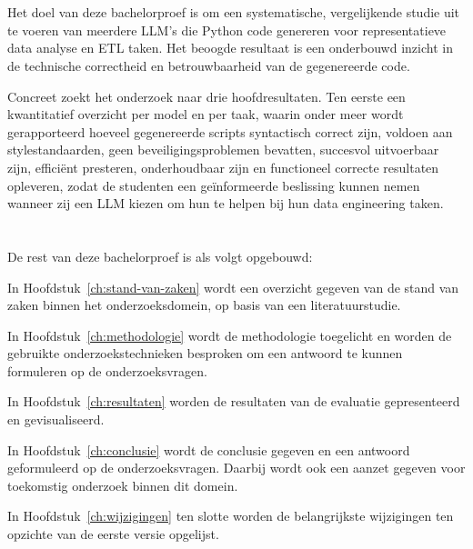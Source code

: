 \section{}%
\label{sec:onderzoeksdoelstelling}

Het doel van deze bachelorproef is om een systematische, vergelijkende studie uit te voeren van meerdere LLM’s die Python code genereren voor representatieve data analyse en ETL taken. Het beoogde resultaat is een onderbouwd inzicht in de technische correctheid en betrouwbaarheid van de gegenereerde code.

Concreet zoekt het onderzoek naar drie hoofdresultaten. Ten eerste een kwantitatief overzicht per model en per taak, waarin onder meer wordt gerapporteerd hoeveel gegenereerde scripts syntactisch correct zijn, voldoen aan stylestandaarden, geen beveiligingsproblemen bevatten, succesvol uitvoerbaar zijn, efficiënt presteren, onderhoudbaar zijn en functioneel correcte resultaten opleveren, zodat de studenten een geïnformeerde beslissing kunnen nemen wanneer zij een LLM kiezen om hun te helpen bij hun data engineering taken.


\section{}%
\label{sec:opzet-bachelorproef}


De rest van deze bachelorproef is als volgt opgebouwd:

In Hoofdstuk~\ref{ch:stand-van-zaken} wordt een overzicht gegeven van de stand van zaken binnen het onderzoeksdomein, op basis van een literatuurstudie.

In Hoofdstuk~\ref{ch:methodologie} wordt de methodologie toegelicht en worden de gebruikte onderzoekstechnieken besproken om een antwoord te kunnen formuleren op de onderzoeksvragen.


In Hoofdstuk~\ref{ch:resultaten} worden de resultaten van de evaluatie gepresenteerd en gevisualiseerd.

In Hoofdstuk~\ref{ch:conclusie} wordt de conclusie gegeven en een antwoord geformuleerd op de onderzoeksvragen. Daarbij wordt ook een aanzet gegeven voor toekomstig onderzoek binnen dit domein.

In Hoofdstuk~\ref{ch:wijzigingen} ten slotte worden de belangrijkste wijzigingen ten opzichte van de eerste versie opgelijst.
